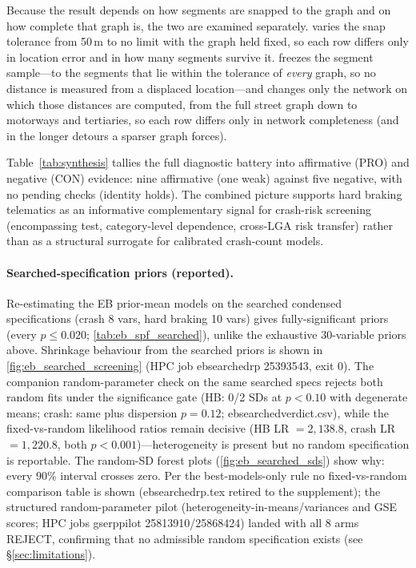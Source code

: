 \documentclass[letterpaper,8pt]{extarticle}  %
\newcommand{\file}[1]{{\ttfamily\def\_{\textunderscore\allowbreak}#1}}
\begin{document}
\begin{doublespacing}
\begin{linenumbers}
{



Because the result depends on how segments are snapped to the graph and on how complete that graph is, the two are examined separately.  varies the snap tolerance from 50\,m to no limit with the graph held fixed, so each row differs only in location error and in how many segments survive it.  freezes the segment sample---to the segments that lie within the tolerance of \emph{every} graph, so no distance is measured from a displaced location---and changes only the network on which those distances are computed, from the full street graph down to motorways and tertiaries, so each row differs only in network completeness (and in the longer detours a sparser graph forces).


}{}

Table~\ref{tab:synthesis} tallies the full diagnostic battery into affirmative (PRO) and negative (CON) evidence: nine affirmative (one weak) against five negative, with no pending checks (identity holds). The combined picture supports hard braking telematics as an informative complementary signal for crash-risk screening (encompassing test, category-level dependence, cross-LGA risk transfer) rather than as a structural surrogate for calibrated crash-count models.



\FloatBarrier




\paragraph{Searched-specification priors (reported).} Re-estimating the EB prior-mean models on the searched condensed specifications (crash 8 vars, hard braking 10 vars) gives fully-significant priors (every $p\leq0.020$; \cref{tab:eb_spf_searched}), unlike the exhaustive 30-variable priors above. Shrinkage behaviour from the searched priors is shown in \cref{fig:eb_searched_screening} (HPC job \file{eb\_searched\_rp} 25393543, exit 0). The companion random-parameter check on the same searched specs rejects both random fits under the significance gate (HB: 0/2 SDs at $p<0.10$ with degenerate means; crash: same plus dispersion $p=0.12$; \file{eb\_searched\_verdict.csv}), while the fixed-vs-random likelihood ratios remain decisive (HB LR $=2{,}138.8$, crash LR $=1{,}220.8$, both $p<0.001$)---heterogeneity is present but no random specification is reportable. The random-SD forest plots (\cref{fig:eb_searched_sds}) show why: every 90\% interval crosses zero. Per the best-models-only rule no fixed-vs-random comparison table is shown (\file{eb\_searched\_rp.tex} retired to the supplement); the structured random-parameter pilot (heterogeneity-in-means/variances and GSE scores; HPC jobs \file{gse\_rp\_pilot} 25813910/25868424) landed with all 8 arms REJECT, confirming that no admissible random specification exists (see \S\ref{sec:limitations}).


\end{linenumbers}
\end{doublespacing}
\end{document}
